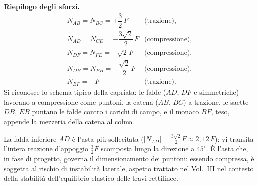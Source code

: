 \begin{esempio}
\begin{svolgimento}
		\noindent\textbf{Riepilogo degli sforzi.}
		\[
		\begin{array}{lll}
			N_{AB} = N_{BC} = +\dfrac{3}{2}\,F
			& \text{(trazione)}, \\[8pt]
			N_{AD} = N_{CE} = -\dfrac{3\sqrt2}{2}\,F
			& \text{(compressione)}, \\[8pt]
			N_{DF} = N_{FE} = -\sqrt2\,F
			& \text{(compressione)}, \\[8pt]
			N_{DB} = N_{EB} = -\dfrac{\sqrt2}{2}\,F
			& \text{(compressione)}, \\[8pt]
			N_{BF} = +F
			& \text{(trazione)}.
		\end{array}
		\]
		Si riconosce lo schema tipico della capriata: le falde
		($AD$, $DF$ e simmetriche) lavorano a compressione
		come puntoni, la catena ($AB$, $BC$) a trazione, le
		saette $DB$, $EB$ puntano le falde contro i carichi
		di campo, e il monaco $BF$, teso, appende la mezzeria
		della catena al colmo.
		\begin{oss}
			La falda inferiore $AD$ è l'asta più sollecitata
			($\lvert N_{AD}\rvert = \tfrac{3\sqrt2}{2}F
			\approx 2{,}12\,F$): vi transita l'intera reazione
			d'appoggio $\tfrac{3}{2}F$ scomposta lungo la
			direzione a $45^\circ$. È l'asta che, in fase di
			progetto, governa il dimensionamento dei puntoni:
			essendo compressa, è soggetta al rischio di
			instabilità laterale, aspetto trattato nel Vol.~III
			nel contesto della stabilità dell'equilibrio
			elastico delle travi rettilinee.
		\end{oss}
	\end{svolgimento}
\end{esempio}



